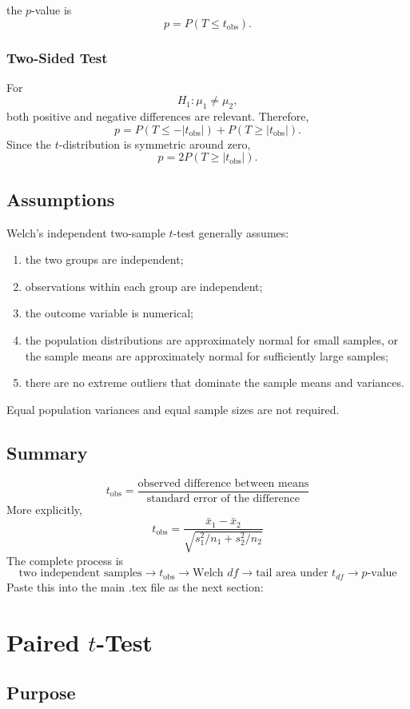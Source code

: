 \documentclass[11pt]{article}
\begin{document}
\] the \(p\)-value is \[ p=P(T\leq t_{\mathrm{obs}}). \] \subsubsection{Two-Sided Test} For \[ H_1:\mu_1\neq\mu_2, \] both positive and negative differences are relevant. Therefore, \[ p = P(T\leq-|t_{\mathrm{obs}}|) + P(T\geq|t_{\mathrm{obs}}|). \] Since the \(t\)-distribution is symmetric around zero, \[ p=2P(T\geq|t_{\mathrm{obs}}|). \] \subsection{Assumptions} Welch's independent two-sample \(t\)-test generally assumes: \begin{enumerate}[noitemsep] \item the two groups are independent; \item observations within each group are independent; \item the outcome variable is numerical; \item the population distributions are approximately normal for small samples, or the sample means are approximately normal for sufficiently large samples; \item there are no extreme outliers that dominate the sample means and variances. \end{enumerate} Equal population variances and equal sample sizes are not required. \subsection{Summary} \[ \boxed{ t_{\mathrm{obs}} = \frac{ \text{observed difference between means} }{ \text{standard error of the difference} } } \] More explicitly, \[ \boxed{ t_{\mathrm{obs}} = \frac{ \bar{x}_1-\bar{x}_2 }{ \sqrt{ s_1^2/n_1+s_2^2/n_2 } } } \] The complete process is \[ \boxed{ \text{two independent samples} \rightarrow t_{\mathrm{obs}} \rightarrow \text{Welch }df \rightarrow \text{tail area under }t_{df} \rightarrow p\text{-value} } \]
Paste this into the main .tex file as the next section:

\section{Paired \(t\)-Test}

\subsection{Purpose}
\end{document}
